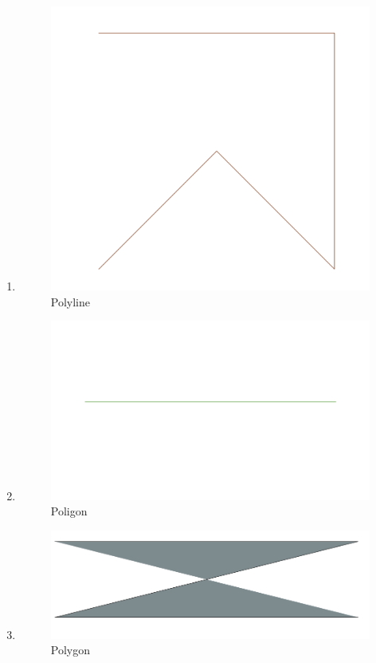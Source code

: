 \begin{enumerate}
	\item 
	
	\begin{figure}[H]
		\includegraphics[width=12cm]{figures/1174040/Python1/Soal5.PNG}
		\centering
		\caption{Polyline}
	\end{figure}
	
	\item 
	
	\begin{figure}[H]
		\includegraphics[width=12cm]{figures/1174040/Python1/Soal6.PNG}
		\centering
		\caption{Poligon}
	\end{figure}
	
	\item 
	
	\begin{figure}[H]
		\includegraphics[width=12cm]{figures/1174040/Python1/Soal7.PNG}
		\centering
		\caption{Polygon}
	\end{figure}
	

\end{enumerate}
